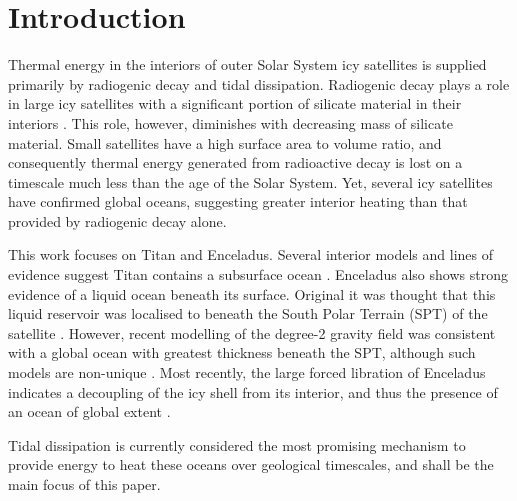 \newpage
\section{Introduction}


Thermal energy in the interiors of outer Solar System icy satellites is supplied primarily by radiogenic decay and tidal dissipation. Radiogenic decay plays a role in large icy satellites with a significant portion of silicate material in their interiors \citep{hussmann2006subsurface}. This role, however, diminishes with decreasing mass of silicate material. Small satellites have a high surface area to volume ratio, and consequently thermal energy generated from radioactive decay is lost on a timescale much less than the age of the Solar System. Yet, several icy satellites have confirmed global oceans, suggesting greater interior heating than that provided by radiogenic decay alone.


This work focuses on Titan and Enceladus. Several interior models and lines of evidence suggest Titan contains a subsurface ocean \citep{sohl2003interior, bills2011rotational, iess2012tides, baland2014titan, mitri2014shape, sohl2014structural}. Enceladus also shows strong evidence of a liquid ocean beneath its surface. Original it was thought that this liquid reservoir was localised to beneath the South Polar Terrain (SPT) of the satellite \citep[e.g.,][]{collins2007enceladus}. However, recent modelling of the degree-2 gravity field was consistent with a global ocean with greatest thickness beneath the SPT, although such models are non-unique \citep{iess2014gravity,mckinnon2015effect}. Most recently, the large forced libration of Enceladus indicates a decoupling of the icy shell from its interior, and thus the presence of an ocean of global extent \citep{thomas2015enceladus}.  

Tidal dissipation is currently considered the most promising mechanism to provide energy to heat these oceans over geological timescales, and shall be the main focus of this paper.

